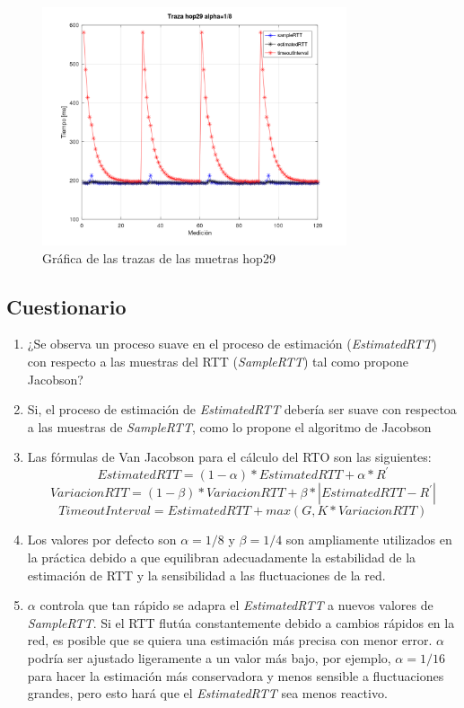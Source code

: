 \begin{figure}[H]
	\centering
	\includegraphics[width=0.8\textwidth]{img/alpha18/trazaHop29.png}
	\caption{Gr\'afica de las trazas de las muetras hop29}
	\label{fig:hop29Graph}
\end{figure}

\newpage
\subsection*{Cuestionario}

\begin{enumerate}
    \item ¿Se observa un proceso suave en el proceso de estimaci\'on (\textit{EstimatedRTT}) con
    respecto a las muestras del RTT (\textit{SampleRTT}) tal como propone Jacobson?
    \item[] Si, el proceso de estimaci\'on de \textit{EstimatedRTT} deber\'ia ser suave con respectoa
    a las muestras de \textit{SampleRTT}, como lo propone el algoritmo de Jacobson
    
    \item Las f\'ormulas de Van Jacobson para el c\'alculo del RTO son las siguientes:
    $$EstimatedRTT = (1-\alpha) * EstimatedRTT + \alpha * R^\prime$$
    $$VariacionRTT = (1-\beta) * VariacionRTT + \beta * |EstimatedRTT-R^\prime|$$
    $$TimeoutInterval = EstimatedRTT + max(G, K*VariacionRTT)$$
    \item[] Los valores por defecto son \(\alpha=1/8\) y \(\beta=1/4\) son ampliamente utilizados
    en la pr\'actica debido a que equilibran adecuadamente la estabilidad de la estimaci\'on de RTT
    y la sensibilidad a las fluctuaciones de la red.
    \item[] \(\alpha\) controla que tan r\'apido se adapra el \textit{EstimatedRTT} a nuevos valores
    de \textit{SampleRTT}. Si el RTT flut\'ua constantemente debido a cambios r\'apidos en la red, es
    posible que se quiera una estimaci\'on m\'as precisa con menor error. \(\alpha\) podr\'ia ser
    ajustado ligeramente a un valor m\'as bajo, por ejemplo, \(\alpha=1/16\) para hacer la estimaci\'on
    m\'as conservadora y menos sensible a fluctuaciones grandes, pero esto har\'a que el \textit{EstimatedRTT}
    sea menos reactivo.
\end{enumerate}